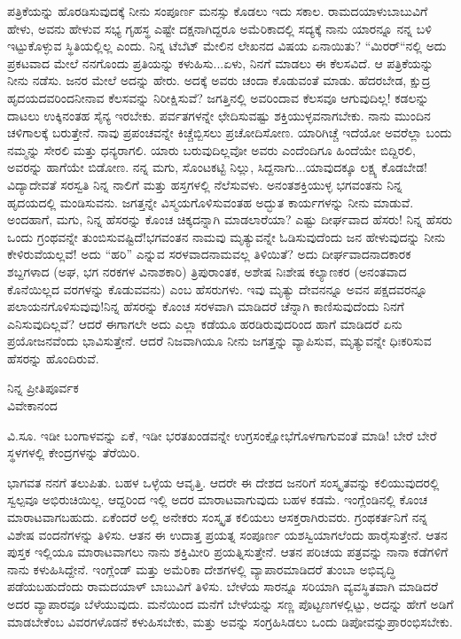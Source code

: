 ಪತ್ರಿಕೆಯನ್ನು ಹೊರಡಿಸುವುದಕ್ಕೆ ನೀನು ಸಂಪೂರ್ಣ ಮನಸ್ಸು ಕೊಡಲು ಇದು ಸಕಾಲ. ರಾಮದಯಾಳುಬಾಬುವಿಗೆ ಹೇಳು, ಅವನು ಹೇಳುವ ಸಭ್ಯ ಗೃಹಸ್ಥ ಎಷ್ಟೇ ದಕ್ಷನಾಗಿದ್ದರೂ ಅಮೆರಿಕಾದಲ್ಲಿ ಸದ್ಯಕ್ಕೆ ನಾನು ಯಾರನ್ನೂ ನನ್ನ ಬಳಿ ಇಟ್ಟುಕೊಳ್ಳುವ ಸ್ಥಿತಿಯಲ್ಲಿಲ್ಲ ಎಂದು. ನಿನ್ನ ಟೆಬೆಟ್ ಮೇಲಿನ ಲೇಖನದ ವಿಷಯ ಏನಾಯಿತು? “ಮಿರರ್“ನಲ್ಲಿ ಅದು ಪ್ರಕಟವಾದ ಮೇಲೆ ನನಗೊಂದು ಪ್ರತಿಯನ್ನು ಕಳುಹಿಸು...ಏಳು, ನಿನಗೆ ಮಾಡಲು ಈ ಕೆಲಸವಿದೆ. ಆ ಪತ್ರಿಕೆಯನ್ನು ನೀನು ನಡೆಸು. ಜನರ ಮೇಲೆ ಅದನ್ನು ಹೇರು. ಅದಕ್ಕೆ ಅವರು ಚಂದಾ ಕೊಡುವಂತೆ ಮಾಡು. ಹೆದರಬೇಡ, ಕ್ಷುದ್ರ ಹೃದಯದವರಿಂದನೀನಾವ ಕೆಲಸವನ್ನು ನಿರೀಕ್ಷಿಸುವೆ? ಜಗತ್ತಿನಲ್ಲಿ ಅವರಿಂದಾವ ಕೆಲಸವೂ ಆಗುವುದಿಲ್ಲ! ಕಡಲನ್ನು ದಾಟಲು ಉಕ್ಕಿನಂತಹ ಸೈನ್ಯ ಇರಬೇಕು. ಪರ್ವತಗಳನ್ನೇ ಛೇದಿಸುವಷ್ಟು ಶಕ್ತಿಯುಳ್ಳವನಾಗಬೇಕು. ನಾನು ಮುಂದಿನ ಚಳಿಗಾಲಕ್ಕೆ ಬರುತ್ತೇನೆ. ನಾವು ಪ್ರಪಂಚವನ್ನೇ ಕಿಚ್ಚೆಬ್ಬಿಸಲು ಪ್ರಚೋದಿಸೋಣ. ಯಾರಿಗಿಚ್ಚೆ ಇದೆಯೋ ಅವರೆಲ್ಲಾ ಬಂದು ನಮ್ಮನ್ನು ಸೇರಲಿ ಮತ್ತು ಧನ್ಯರಾಗಲಿ. ಯಾರು ಬರುವುದಿಲ್ಲವೋ ಅವರು ಎಂದೆಂದಿಗೂ ಹಿಂದೆಯೇ ಬಿದ್ದಿರಲಿ, ಅವರನ್ನು ಹಾಗೆಯೇ ಬಿಡೋಣ. ನನ್ನ ಮಗು, ಸೊಂಟಕಟ್ಟಿ ನಿಲ್ಲು, ಸಿದ್ದನಾಗು...ಯಾವುದಕ್ಕೂ ಲಕ್ಷ್ಯ ಕೊಡಬೇಡ! ವಿದ್ಯಾದೇವತೆ ಸರಸ್ವತಿ ನಿನ್ನ ನಾಲಿಗೆ ಮತ್ತು ಹಸ್ತಗಳಲ್ಲಿ ನೆಲೆಸುವಳು. ಅನಂತಶಕ್ತಿಯುಳ್ಳ ಭಗವಂತನು ನಿನ್ನ ಹೃದಯದಲ್ಲಿ ಮಂಡಿಸುವನು. ಜಗತ್ತನ್ನೇ ವಿಸ್ಮಯಗೊಳಿಸುವಂತಹ ಅದ್ಭುತ ಕಾರ್ಯಗಳನ್ನು ನೀನು ಮಾಡುವೆ. ಅಂದಹಾಗೆ, ಮಗು, ನಿನ್ನ ಹೆಸರನ್ನು ಕೊಂಚ ಚಿಕ್ಕದನ್ನಾಗಿ ಮಾಡಲಾರೆಯಾ? ಎಷ್ಟು ದೀರ್ಘವಾದ ಹೆಸರು! ನಿನ್ನ ಹೆಸರು ಒಂದು ಗ್ರಂಥವನ್ನೇ ತುಂಬಿಸುವಷ್ಟಿದೆ!ಭಗವಂತನ ನಾಮವು ಮೃತ್ಯುವನ್ನೇ ಓಡಿಸುವುದೆಂದು ಜನ ಹೇಳುವುದನ್ನು ನೀನು ಕೇಳಿರುವೆಯಲ್ಲವೆ! ಅದು “ಹರಿ” ಎನ್ನುವ ಸರಳವಾದನಾಮವಲ್ಲ ತಿಳಿಯಿತೆ? ಅದು ದೀರ್ಘವಾದನಾದಕಾರಕ ಶಬ್ದಗಳಾದ\enginline{-} (ಅಘ, ಭಗ ನರಕಗಳ ವಿನಾಶಕಾರಿ) ತ್ರಿಪುರಾಂತಕ, ಅಶೇಷ ನಿಃಶೇಷ ಕಲ್ಯಾಣಕರ (ಅನಂತವಾದ ಕೊನೆಯಿಲ್ಲದ ವರಗಳನ್ನು ಕೊಡುವವನು) ಎಂಬ ಹೆಸರುಗಳು. ಇವು ಮೃತ್ಯು ದೇವನನ್ನೂ ಅವನ ಪಕ್ಷದವರನ್ನೂ ಪಲಾಯನಗೊಳಿಸುವುವು!ನಿನ್ನ ಹೆಸರನ್ನು ಕೊಂಚ ಸರಳವಾಗಿ ಮಾಡಿದರೆ ಚೆನ್ನಾಗಿ ಕಾಣಿಸುವುದೆಂದು ನಿನಗೆ ಎನಿಸುವುದಿಲ್ಲವೆ? ಆದರೆ ಈಗಾಗಲೇ ಅದು ಎಲ್ಲಾ ಕಡೆಯೂ ಹರಡಿರುವುದರಿಂದ ಹಾಗೆ ಮಾಡಿದರೆ ಏನು ಪ್ರಯೋಜನವೆಂದು ಭಾವಿಸುತ್ತೇನೆ. ಆದರೆ ನಿಜವಾಗಿಯೂ ನೀನು ಜಗತ್ತನ್ನು ವ್ಯಾಪಿಸುವ, ಮೃತ್ಯುವನ್ನೇ ಧಿಃಕರಿಸುವ ಹೆಸರನ್ನು ಹೊಂದಿರುವೆ.

\begin{flushright}
ನಿನ್ನ ಪ್ರೀತಿಪೂರ್ವಕ\\ವಿವೇಕಾನಂದ
\end{flushright}

\vspace{-0.3cm}

\vspace{0.1cm}

ವಿ.ಸೂ.\enginline{-} ಇಡೀ ಬಂಗಾಳವನ್ನು ಏಕೆ, ಇಡೀ ಭರತಖಂಡವನ್ನೇ ಉಗ್ರಸಂಕ್ಷೋಭೆಗೊಳಗಾಗುವಂತೆ ಮಾಡಿ! ಬೇರೆ ಬೇರೆ ಸ್ಥಳಗಳಲ್ಲಿ ಕೇಂದ್ರಗಳನ್ನು ತೆರೆಯಿರಿ.

\vspace{0.1cm}

ಭಾಗವತ ನನಗೆ ತಲುಪಿತು. ಬಹಳ ಒಳ್ಳೆಯ ಆವೃತ್ತಿ. ಆದರೇ ಈ ದೇಶದ ಜನರಿಗೆ ಸಂಸ್ಕೃತವನ್ನು ಕಲಿಯುವುದರಲ್ಲಿ ಸ್ವಲ್ಪವೂ ಅಭಿರುಚಿಯಿಲ್ಲ. ಆದ್ದರಿಂದ ಇಲ್ಲಿ ಅದರ ಮಾರಾಟವಾಗುವುದು ಬಹಳ ಕಡಮೆ. ಇಂಗ್ಲೆಂಡಿನಲ್ಲಿ ಕೊಂಚ ಮಾರಾಟವಾಗಬಹುದು. ಏಕೆಂದರೆ ಅಲ್ಲಿ ಅನೇಕರು ಸಂಸ್ಕೃತ ಕಲಿಯಲು ಆಸಕ್ತರಾಗಿರುವರು. ಗ್ರಂಥಕರ್ತನಿಗೆ ನನ್ನ ವಿಶೇಷ ವಂದನೆಗಳನ್ನು ತಿಳಿಸು. ಆತನ ಈ ಉದಾತ್ತ ಪ್ರಯತ್ನ ಸಂಪೂರ್ಣ ಯಶಸ್ವಿಯಾಗಲೆಂದು ಹಾರೈಸುತ್ತೇನೆ. ಆತನ ಪುಸ್ತಕ ಇಲ್ಲಿಯೂ ಮಾರಾಟವಾಗಲು ನಾನು ಶಕ್ತಿಮೀರಿ ಪ್ರಯತ್ನಿಸುತ್ತೇನೆ. ಆತನ ಪರಿಚಯ ಪತ್ರವನ್ನು ನಾನಾ ಕಡೆಗಳಿಗೆ ನಾನು ಕಳುಹಿಸಿದ್ದೇನೆ. ಇಂಗ್ಲೆಂಡ್ ಮತ್ತು ಅಮೆರಿಕಾ ದೇಶಗಳಲ್ಲಿ ವ್ಯಾಪಾರಮಾಡಿದರೆ ತುಂಬಾ ಅಭಿವೃದ್ಧಿ ಪಡೆಯಬಹುದೆಂದು ರಾಮದಯಾಳ್ ಬಾಬುವಿಗೆ ತಿಳಿಸು. ಬೇಳೆಯ ಸಾರನ್ನೂ ಸರಿಯಾಗಿ ವ್ಯವಸ್ಥಿತವಾಗಿ ಮಾಡಿದರೆ ಅದರ ವ್ಯಾಪಾರವೂ ಬೆಳೆಯುವುದು. ಮನೆಯಿಂದ ಮನೆಗೆ ಬೇಳೆಯನ್ನು ಸಣ್ಣ ಪೊಟ್ಟಣಗಳಲ್ಲಿಟ್ಟು, ಅದನ್ನು ಹೇಗೆ ಅಡಿಗೆ ಮಾಡಬೇಕೆಂಬ ವಿವರ\break ಗಳೊಡನೆ ಕಳುಹಿಸಬೇಕು, ಮತ್ತು ಅವನ್ನು ಸಂಗ್ರಹಿಸಿಡಲು ಒಂದು ಡಿಪೋವನ್ನು\break ಪ್ರಾರಂಭಿಸಬೇಕು.

